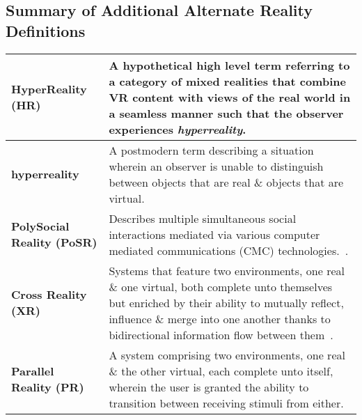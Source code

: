 \subsection{Summary of Additional Alternate Reality Definitions}
\label{summaryofadditionalalternaterealitydefinitions}

\begin{center}
\begin{longtable}{| l | p{12cm} |}

\hline	
	
		
\textbf{HyperReality (HR)} & A hypothetical high level term referring to a category of mixed realities that combine VR content with views of the real world in a seamless manner such that the observer experiences \textit{hyperreality}. \\
		
\hline
		

\textbf{hyperreality} & A postmodern term describing a situation wherein an observer is unable to distinguish between objects that are real \& objects that are virtual. \\

\hline

		
\textbf{PolySocial Reality (PoSR)} & Describes multiple simultaneous social interactions mediated via various computer mediated communications (CMC) technologies.~\cite{Applin2012}. \\

\hline


\textbf{Cross Reality (XR)} & Systems that feature two environments, one real \& one virtual, both complete unto themselves~\cite{lifton:merging} but enriched by their ability to mutually reflect, influence \& merge into one another thanks to bidirectional information flow between them~\cite{kim:practical}. \\

\hline


\textbf{Parallel Reality (PR)} & A system comprising two environments, one real \& the other virtual, each complete unto itself, wherein the user is granted the ability to transition between receiving stimuli from either. \\

\hline


\end{longtable}
\end{center}

